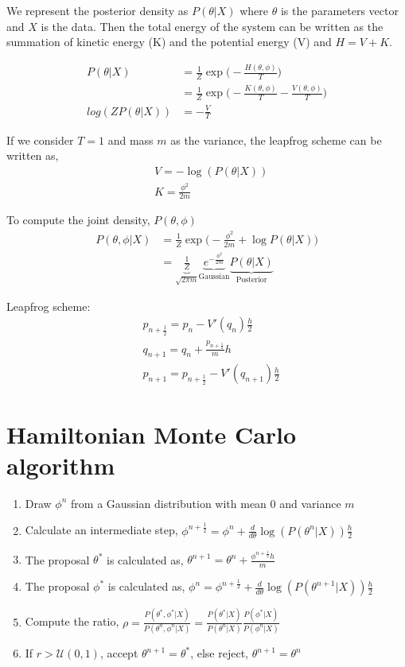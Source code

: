 \documentclass[a4paper,11pt]{article}
\begin{document}
We represent the posterior density as $P(\theta | X)$ where $\theta$ is the parameters vector and $X$ is the data. Then the total energy of the system can be written as the summation of kinetic energy (K) and the potential energy (V) and $H = V + K$.

\begin{align*}
P(\theta | X) & = \frac{1}{Z} \exp \bigg(- \frac{H(\theta, \phi)}{T} \bigg) \\
& = \frac{1}{Z} \exp \bigg( -\frac{K(\theta, \phi)}{T} - \frac{V(\theta, \phi)}{T}\bigg) \\
log(Z P(\theta | X)) & = - \frac{V}{T}
\end{align*}

If we consider $T = 1$ and mass $m$ as the variance, the leapfrog scheme can be written as,
\begin{align*}
& V = - \log(P(\theta | X)) \\
& K = \frac{\phi^2}{2m}
\end{align*}

To compute the joint density, $P(\theta, \phi)$
\begin{align*}
P(\theta, \phi | X) & = \frac{1}{Z} \exp \bigg(- \frac{\phi^2}{2m} + \log P(\theta | X) \bigg) \\
& = \underbrace{\frac{1}{Z}}_{\sqrt{2 \pi m}} \underbrace{e^{- \frac{\phi^2}{2m}}}_\text{Gaussian} \underbrace{P(\theta | X)}_\text{Posterior}
\end{align*}

Leapfrog scheme:
\begin{align*}
& p_{n+\frac{1}{2}} = p_n - V'(q_n)\frac{h}{2} \\
& q_{n+1} = q_n + \frac{p_{n+\frac{1}{2}}}{m}h \\
& p_{n+1} = p_{n+\frac{1}{2}} - V'(q_{n+1}) \frac{h}{2}
\end{align*}

\section{Hamiltonian Monte Carlo algorithm}
\begin{enumerate}
\item Draw $\phi^n$ from a Gaussian distribution with mean 0 and variance $m$
\item Calculate an intermediate step, $\phi ^ {n + \frac{1}{2}} = \phi^n + \frac{d}{d\theta} \log(P(\theta^n | X)) \frac{h}{2}$
\item The proposal $\theta^*$ is calculated as, $\theta^{n+1} = \theta^n + \frac{\phi^{n + \frac{1}{2}}h}{m}$
\item The proposal $\phi^*$ is calculated as, $\phi^n = \phi^{n+\frac{1}{2}} + \frac{d}{d\theta} \log(P(\theta^{n+1} | X))\frac{h}{2}$ 
\item Compute the ratio, $\rho = \frac{P(\theta^*, \phi^* | X)}{P(\theta^n, \phi^n | X)} = \frac{P(\theta^* | X)}{P(\theta^n | X)} \frac{P(\phi^* | X)}{P(\phi^n | X)}$
\item If $r > \mathcal{U}(0, 1)$, accept $\theta^{n+1} = \theta^*$, else reject, $\theta^{n+1} = \theta^n $
\end{enumerate}
\end{document}
